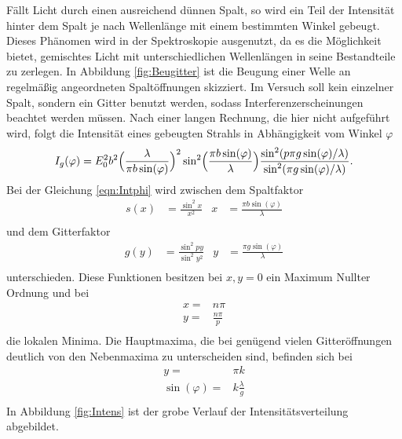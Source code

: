 Fällt Licht durch einen ausreichend dünnen Spalt, so wird ein Teil der
Intensität hinter dem Spalt je nach Wellenlänge mit einem bestimmten Winkel
gebeugt. Dieses Phänomen wird in der Spektroskopie
ausgenutzt, da es die Möglichkeit bietet, gemischtes Licht mit
unterschiedlichen Wellenlängen in seine Bestandteile zu zerlegen.
In Abbildung \ref{fig:Beugitter} ist die Beugung einer
Welle an regelmäßig angeordneten Spaltöffnungen skizziert. Im Versuch soll
kein einzelner Spalt, sondern ein Gitter benutzt werden, sodass
Interferenzerscheinungen beachtet werden müssen.
Nach einer langen Rechnung, die hier nicht aufgeführt wird, folgt die
Intensität eines gebeugten Strahls in Abhängigkeit vom Winkel $\varphi$
\begin{equation}
  I_g(\varphi) = E_0^2 b^2 \Bigl(\frac{\lambda}{\pi b \sin(\varphi)}\Bigr)^2
  \sin^2\Bigl(\frac{\pi b \sin(\varphi)}{\lambda}\Bigr) \frac{\sin^2(p \pi g
  \sin (\varphi)/\lambda)}{\sin^2(\pi g \sin (\varphi)/\lambda)}.
  \label{eqn:Intphi}
\end{equation}
Bei der Gleichung \eqref{eqn:Intphi} wird zwischen dem Spaltfaktor
\begin{align}
  s(x) & = \frac{\sin^2 x}{x^2} & x & = \frac{\pi b \sin(\varphi)}{\lambda} \\
\end{align}
und dem Gitterfaktor
\begin{align}
  g(y) & = \frac{\sin^2 p y}{\sin^2 y^2} & y & = \frac{\pi g \sin(\varphi)}{\lambda} \\
\end{align}
unterschieden.
Diese Funktionen besitzen bei $x,y = 0$ ein Maximum Nullter Ordnung und bei
\begin{align}
  x = & n\pi \\
  y = & \frac{n\pi}{p} \\
\end{align}
die lokalen Minima.
Die Hauptmaxima, die bei genügend vielen Gitteröffnungen deutlich von den
Nebenmaxima zu unterscheiden sind, befinden sich bei
\begin{align}
  y = & \pi k \\
  \sin(\varphi) = & k \frac{\lambda}{g} \\
  \label{eqn:Gitter}
\end{align}
In Abbildung \ref{fig:Intens} ist der grobe Verlauf der Intensitätsverteilung
abgebildet.

